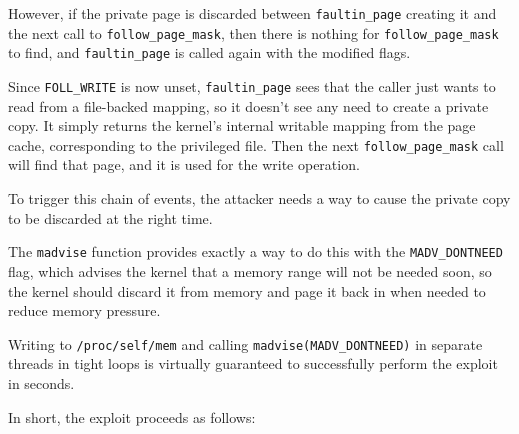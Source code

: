 \documentclass[a4paper,10pt,twocolumn,english]{article}
\newcommand{\code}[1]{\texttt{#1}}
\begin{document}
However, if the private page is discarded between \code{faultin\_page} creating it and the next call to \code{follow\_page\_mask},
then there is nothing for \code{follow\_page\_mask} to find, and \code{faultin\_page} is called again with the modified flags.

Since \code{FOLL\_WRITE} is now unset, \code{faultin\_page} sees that the caller just wants to read from a file-backed mapping, so it doesn't see any need to create a private copy.
It simply returns the kernel's internal writable mapping from the page cache, corresponding to the privileged file.
Then the next \code{follow\_page\_mask} call will find that page, and it is used for the write operation.

To trigger this chain of events, the attacker needs a way to cause the private copy to be discarded at the right time.

The \code{madvise} function provides exactly a way to do this with the \code{MADV\_DONTNEED} flag, which advises the kernel that
a memory range will not be needed soon, so the kernel should discard it from memory and page it back in when needed to reduce memory pressure.

Writing to \code{/proc/self/mem} and calling \code{madvise(MADV\_DONTNEED)} in separate threads in tight loops is virtually guaranteed to successfully perform the exploit in seconds.

In short, the exploit proceeds as follows:
\end{document}
